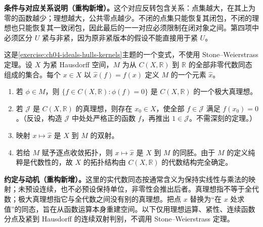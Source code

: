 \documentclass[../../main.tex]{subfiles}%
\begin{document}
\begin{remark}
\textbf{条件与对应关系说明（重构新增）。}这个对应反转包含关系：点集越大，在其上为零的函数越少；理想越大，公共零点越少。不闭的点集只能恢复其闭包，不闭的理想也只能恢复其一致闭包，因此最后的一一对应必须限制在闭对象之间。第四项中必须区分 $U$ 紧与非紧，因为原非紧版本的假设不能直接用于紧 $U$。
\end{remark}
\begin{exercise}\label{exercise:ch04-recover-space-from-algebra}
这是\cref{exercise:ch04-ideals-hulls-kernels}主题的一个变式，不使用 Stone--Weierstrass 定理。设 $X$ 为紧 Hausdorff 空间，$M$ 为从 $C(X,\mathbb R)$ 到 $\mathbb R$ 的全部非零代数同态组成的集合。每个 $x\in X$ 以 $\widehat x(f)=f(x)$ 定义 $M$ 的一个元素 $\widehat x$。
\begin{enumerate}
\item\label{item:ch04-character-maximal-kernel} 若 $\phi\in M$，则 $\{f\in C(X,\mathbb R):\phi(f)=0\}$ 是 $C(X,\mathbb R)$ 的一个极大真理想。
\item\label{item:ch04-proper-ideal-common-zero} 若 $\mathcal J$ 是 $C(X,\mathbb R)$ 的真理想，则存在 $x_0\in X$，使全部 $f\in\mathcal J$ 满足 $f(x_0)=0$。（反设，构造 $\mathcal J$ 中处处严格正的函数 $f$，再推出 $1\in\mathcal J$。不需深刻的定理。）
\item\label{item:ch04-evaluation-bijection} 映射 $x\mapsto\widehat x$ 是 $X$ 到 $M$ 的双射。
\item\label{item:ch04-evaluation-homeomorphism} 若给 $M$ 赋予逐点收敛拓扑，则 $x\mapsto\widehat x$ 是 $X$ 到 $M$ 的同胚。由于 $M$ 的定义纯粹是代数性的，故 $X$ 的拓扑结构由 $C(X,\mathbb R)$ 的代数结构完全确定。
\end{enumerate}
\end{exercise}
\begin{remark}
\textbf{约定与动机（重构新增）。}这里的实代数同态按通常含义为保持实线性与乘法的映射；未预设连续，也不必预设保持单位，非零性会推出后者。真理想指不等于全代数；极大真理想指它与全代数之间没有别的真理想。把点 $x$ 替换为“在 $x$ 处求值”的同态，旨在从函数运算本身重建空间。以下仅用理想运算、紧性、连续函数分点及紧到 Hausdorff 的连续双射判别，不调用 Stone--Weierstrass 定理。
\end{remark}
\end{document}
